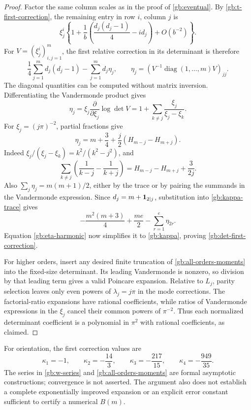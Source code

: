 \begin{proof}
Factor the same column scales as in the proof of
\cref{gb:eventual}.  By \eqref{gb:t-first-correction}, the remaining
entry in row $i$, column $j$ is
\[
 \xi_j^i\left\{1+\frac1b
           \left(\frac{d_j(d_j-1)}4-id_j\right)+O(b^{-2})\right\}.
\]
For $V=(\xi_j^i)_{i,j=1}^m$, the first relative correction in its
determinant is therefore
\begin{equation}\label{gb:kappa-trace}
 \frac14\sum_{j=1}^md_j(d_j-1)-\sum_{j=1}^md_j\eta_j,
 \qquad
 \eta_j=\left(V^{-1}\operatorname{diag}(1,\ldots,m)V\right)_{jj}.
\end{equation}
The diagonal quantities can be computed without matrix inversion.
Differentiating the Vandermonde product gives
\[
 \eta_j=\xi_j\frac{\partial}{\partial\xi_j}\log\det V
       =1+\sum_{k\ne j}\frac{\xi_j}{\xi_j-\xi_k}.
\]
For $\xi_j=(j\pi)^{-2}$, partial fractions give
\begin{equation}\label{gb:eta-harmonic}
 \eta_j=m+\frac34+\frac j2(H_{m-j}-H_{m+j}).
\end{equation}
Indeed $\xi_j/(\xi_j-\xi_k)=k^2/(k^2-j^2)$, and
\[
 \sum_{k\ne j}\left(\frac1{k-j}-\frac1{k+j}\right)
        =H_{m-j}-H_{m+j}+\frac{3}{2j}.
\]
Also $\sum_j\eta_j=m(m+1)/2$, either by the trace or by
pairing the summands in the Vandermonde expression.  Since
$d_j=m+\mathbf 1_{2\mid j}$, substitution into
\eqref{gb:kappa-trace} gives
\[
 -\frac{m^2(m+3)}4+\frac{me}{2}
                         -\sum_{r=1}^e\eta_{2r}.
\]
Equation \eqref{gb:eta-harmonic} now simplifies it to
\eqref{gb:kappa}, proving \eqref{gb:det-first-correction}.

For higher orders, insert any desired finite truncation of
\eqref{gb:all-orders-moments} into the fixed-size determinant.
Its leading Vandermonde is nonzero, so division by that leading
term gives a valid Poincare expansion.  Relative to $L_j$, parity
selection leaves only even powers of $\lambda_j=j\pi$ in the
mode corrections.  The factorial-ratio expansions have rational
coefficients, while ratios of Vandermonde expressions in the
$\xi_j$ cancel their common powers of $\pi^{-2}$.  Thus each
normalized determinant coefficient is a polynomial in $\pi^2$
with rational coefficients, as claimed.
\end{proof}

For orientation, the first correction values are
\[
 \kappa_1=-1,\qquad\kappa_2=-\frac{14}{3},\qquad
 \kappa_3=-\frac{217}{15},\qquad\kappa_4=-\frac{949}{35}.
\]
The series in \eqref{gb:w-series} and
\eqref{gb:all-orders-moments} are formal asymptotic constructions;
convergence is not asserted.  The argument also does not establish
a complete exponentially improved expansion or an explicit error
constant sufficient to certify a numerical $B(m)$.


